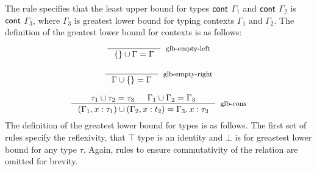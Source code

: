 \documentclass[review]{elsarticle}
\theoremstyle{definition}
\newcommand{\Con}[1]{\red{\mathsf{#1}}}
\begin{document}
The rule specifies that the least upper bound for types \ensuremath{\Con{cont}} $\Gamma_1$ and \ensuremath{\Con{cont}} $\Gamma_2$ is
\ensuremath{\Con{cont}} $\Gamma_3$, where $\Gamma_3$ is greatest lower bound for typing contexts $\Gamma_1$ and $\Gamma_2$.
The definition of the greatest lower bound for contexts is as follows:
\[
  \begin{array}{c}
    \inference{}{\{\} \cup \Gamma = \Gamma}[glb-empty-left] \\ \\
    \inference{}{\Gamma \cup \{\} = \Gamma}[glb-empty-right] \\ \\
      \inference{\tau_1 \sqcup \tau_2 = \tau_3 & \Gamma_1 \cup \Gamma_2 = \Gamma_3}
                {(\Gamma_1 , x : \tau_1) \cup (\Gamma_2 , x : t_2) = \Gamma_3, x : \tau_3}
                [glb-cons]
  \end{array}
\]
The definition of the greatest lower bound for types is as follows. The first set of rules specify the reflexivity,
that $\top$ type is an identity and $\bot$ is for greastest lower bound for any type $\tau$.
Again, rules to ensure commutativity of the relation are omitted for brevity.
\end{document}

